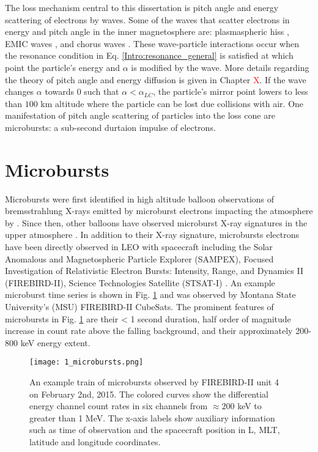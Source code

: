 The loss mechanism central to this dissertation is pitch angle and energy scattering of electrons by waves. Some of the waves that scatter electrons in energy and pitch angle in the inner magnetosphere are: plasmaspheric hiss \citep[e.g.][]{O'Brien2014, Breneman2015}, EMIC waves \citep[e.g.][]{Hendry2017, Capannolo2019energetic}, and chorus waves \citep[e.g.][]{Breneman2017, Kasahara2018, Ozaki2019}. These wave-particle interactions occur when the resonance condition in Eq. \ref{Intro:resonance_general} is satisfied at which point the particle's energy and $\alpha$ is modified by the wave. More details regarding the theory of pitch angle and energy diffusion is given in Chapter \textcolor{red}{X}. If the wave changes $\alpha$ towards $0$ such that $\alpha < \alpha_{LC}$, the particle's mirror point lowers to less than $100$ km altitude where the particle can be lost due collisions with air. One manifestation of pitch angle scattering of particles into the loss cone are microbursts: a sub-second durtaion impulse of electrons.

\section{Microbursts}\label{Intro:microbursts}
Microbursts were first identified in high altitude balloon observations of bremsstrahlung X-rays emitted by microburst electrons impacting the atmosphere by \citet{Anderson1964}. Since then, other balloons have observed microburst X-ray signatures in the upper atmosphere \citep[e.g.][]{Trefall1966, Brown1965, Barcus1966, Anderson2017, Parks1967, Woodger2015}. In addition to their X-ray signature, microbursts electrons have been directly observed in LEO with spacecraft including the Solar Anomalous and Magnetospheric Particle Explorer (SAMPEX), Focused Investigation of Relativistic Electron Bursts: Intensity, Range, and Dynamics II (FIREBIRD-II), Science Technologies Satellite (STSAT-I)  \citep[e.g.][]{Blake1996, Blum2015, Lorentzen2001a, Lorentzen2001b, Nakamura1995, Nakamura2000, O'Brien2003, O'Brien2004, Crew2016, Breneman2017, Lee2005, Lee2012}. An example microburst time series is shown in Fig. \ref{Intro:microbursts} and was observed by Montana State University's (MSU) FIREBIRD-II CubeSats. The prominent features of microbursts in Fig. \ref{Intro:microbursts} are their < 1 second duration, half order of magnitude increase in count rate above the falling background, and their approximately 200-800 keV energy extent.

\begin{figure}
\texttt{[image: 1\_microbursts.png]}
\caption{An example train of microbursts observed by FIREBIRD-II unit 4 on February 2nd, 2015. The colored curves show the differential energy channel count rates in six channels from $\approx 200$ keV to greater than 1 MeV. The x-axis labels show auxiliary information such as time of observation and the spacecraft position in L, MLT, latitude and longitude coordinates.}
\label{Intro:microbursts}
\end{figure}


